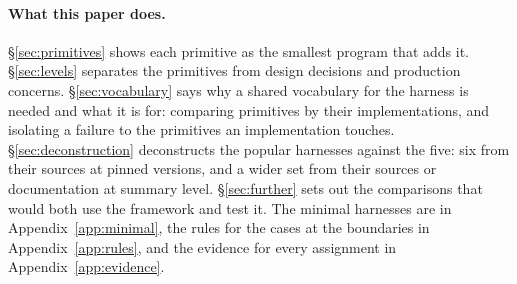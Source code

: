 \paragraph{What this paper does.} \S\ref{sec:primitives} shows each primitive as the smallest program that adds it. \S\ref{sec:levels} separates the primitives from design decisions and production concerns. \S\ref{sec:vocabulary} says why a shared vocabulary for the harness is needed and what it is for: comparing primitives by their implementations, and isolating a failure to the primitives an implementation touches. \S\ref{sec:deconstruction} deconstructs the popular harnesses against the five: six from their sources at pinned versions, and a wider set from their sources or documentation at summary level. \S\ref{sec:further} sets out the comparisons that would both use the framework and test it. The minimal harnesses are in Appendix~\ref{app:minimal}, the rules for the cases at the boundaries in Appendix~\ref{app:rules}, and the evidence for every assignment in Appendix~\ref{app:evidence}.

